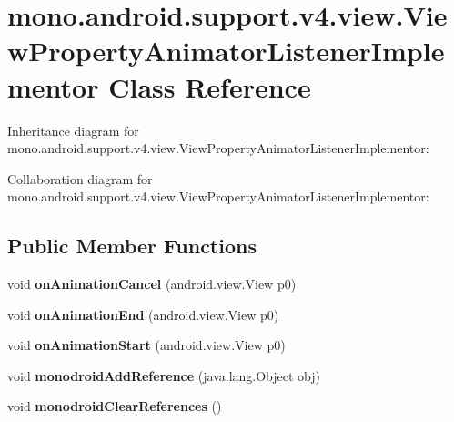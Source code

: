 \hypertarget{classmono_1_1android_1_1support_1_1v4_1_1view_1_1_view_property_animator_listener_implementor}{}\section{mono.\+android.\+support.\+v4.\+view.\+View\+Property\+Animator\+Listener\+Implementor Class Reference}
\label{classmono_1_1android_1_1support_1_1v4_1_1view_1_1_view_property_animator_listener_implementor}


Inheritance diagram for mono.\+android.\+support.\+v4.\+view.\+View\+Property\+Animator\+Listener\+Implementor\+:


Collaboration diagram for mono.\+android.\+support.\+v4.\+view.\+View\+Property\+Animator\+Listener\+Implementor\+:
\subsection*{Public Member Functions}
\begin{DoxyCompactItemize}
\item 
\mbox{\label{classmono_1_1android_1_1support_1_1v4_1_1view_1_1_view_property_animator_listener_implementor_a02bf20da31e0f81ebb3620fb9ff53859}} 
void {\bfseries on\+Animation\+Cancel} (android.\+view.\+View p0)
\item 
\mbox{\label{classmono_1_1android_1_1support_1_1v4_1_1view_1_1_view_property_animator_listener_implementor_a1d667373e9a8fc045c1d534c2dd0e794}} 
void {\bfseries on\+Animation\+End} (android.\+view.\+View p0)
\item 
\mbox{\label{classmono_1_1android_1_1support_1_1v4_1_1view_1_1_view_property_animator_listener_implementor_a2b36e1119b339c78bd7e45838d270d96}} 
void {\bfseries on\+Animation\+Start} (android.\+view.\+View p0)
\item 
\mbox{\label{classmono_1_1android_1_1support_1_1v4_1_1view_1_1_view_property_animator_listener_implementor_a5348ae6f507332f6bec7d1ffd2e03e39}} 
void {\bfseries monodroid\+Add\+Reference} (java.\+lang.\+Object obj)
\item 
\mbox{\label{classmono_1_1android_1_1support_1_1v4_1_1view_1_1_view_property_animator_listener_implementor_a113554921abc116cf26103f4789a6efb}} 
void {\bfseries monodroid\+Clear\+References} ()
\end{DoxyCompactItemize}
